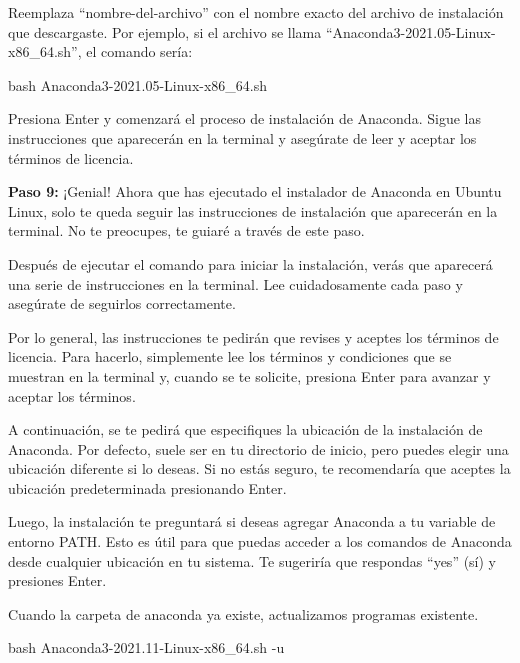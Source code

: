 \documentclass[
  a4paper,
]{article}
\newenvironment{Shaded}{}{}
\newcommand{\AttributeTok}[1]{\textcolor[rgb]{0.84,0.23,0.29}{#1}}
\newcommand{\FunctionTok}[1]{\textcolor[rgb]{0.44,0.26,0.76}{#1}}
\newcommand{\NormalTok}[1]{\textcolor[rgb]{0.14,0.16,0.18}{#1}}
\begin{document}
Reemplaza ``nombre-del-archivo'' con el nombre exacto del archivo de
instalación que descargaste. Por ejemplo, si el archivo se llama
``Anaconda3-2021.05-Linux-x86\_64.sh'', el comando sería:

\begin{Shaded}
\begin{Highlighting}[]
\FunctionTok{bash}\NormalTok{ Anaconda3{-}2021.05{-}Linux{-}x86\_64.sh}
\end{Highlighting}
\end{Shaded}

Presiona Enter y comenzará el proceso de instalación de Anaconda. Sigue
las instrucciones que aparecerán en la terminal y asegúrate de leer y
aceptar los términos de licencia.

\textbf{Paso 9:} ¡Genial! Ahora que has ejecutado el instalador de
Anaconda en Ubuntu Linux, solo te queda seguir las instrucciones de
instalación que aparecerán en la terminal. No te preocupes, te guiaré a
través de este paso.

Después de ejecutar el comando para iniciar la instalación, verás que
aparecerá una serie de instrucciones en la terminal. Lee cuidadosamente
cada paso y asegúrate de seguirlos correctamente.

Por lo general, las instrucciones te pedirán que revises y aceptes los
términos de licencia. Para hacerlo, simplemente lee los términos y
condiciones que se muestran en la terminal y, cuando se te solicite,
presiona Enter para avanzar y aceptar los términos.

A continuación, se te pedirá que especifiques la ubicación de la
instalación de Anaconda. Por defecto, suele ser en tu directorio de
inicio, pero puedes elegir una ubicación diferente si lo deseas. Si no
estás seguro, te recomendaría que aceptes la ubicación predeterminada
presionando Enter.

Luego, la instalación te preguntará si deseas agregar Anaconda a tu
variable de entorno PATH. Esto es útil para que puedas acceder a los
comandos de Anaconda desde cualquier ubicación en tu sistema. Te
sugeriría que respondas ``yes'' (sí) y presiones Enter.

Cuando la carpeta de anaconda ya existe, actualizamos programas
existente.

\begin{Shaded}
\begin{Highlighting}[]
\FunctionTok{bash}\NormalTok{ Anaconda3{-}2021.11{-}Linux{-}x86\_64.sh }\AttributeTok{{-}u} 
\end{Highlighting}
\end{Shaded}
\end{document}
